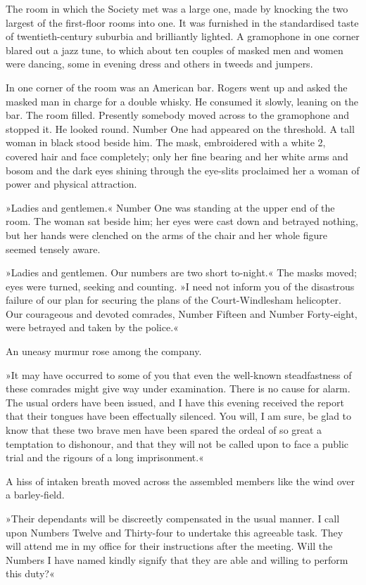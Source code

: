 The room in which the Society met was a large one, made by knocking the two largest of the first-floor rooms into one. It was furnished in the standardised taste of twentieth-century suburbia and brilliantly lighted. A gramophone in one corner blared out a jazz tune, to which about ten couples of masked men and women were dancing, some in evening dress and others in tweeds and jumpers.

In one corner of the room was an American bar. Rogers went up and asked the masked man in charge for a double whisky. He consumed it slowly, leaning on the bar. The room filled. Presently somebody moved across to the gramophone and stopped it. He looked round. Number One had appeared on the threshold. A tall woman in black stood beside him. The mask, embroidered with a white 2, covered hair and face completely; only her fine bearing and her white arms and bosom and the dark eyes shining through the eye-slits proclaimed her a woman of power and physical attraction.

»Ladies and gentlemen.« Number One was standing at the upper end of the room. The woman sat beside him; her eyes were cast down and betrayed nothing, but her hands were clenched on the arms of the chair and her whole figure seemed tensely aware.

»Ladies and gentlemen. Our numbers are two short to-night.« The masks moved; eyes were turned, seeking and counting. »I need not inform you of the disastrous failure of our plan for securing the plans of the Court-Windlesham helicopter. Our courageous and devoted comrades, Number Fifteen and Number Forty-eight, were betrayed and taken by the police.«

An uneasy murmur rose among the company.

»It may have occurred to some of you that even the well-known steadfastness of these comrades might give way under examination. There is no cause for alarm. The usual orders have been issued, and I have this evening received the report that their tongues have been effectually silenced. You will, I am sure, be glad to know that these two brave men have been spared the ordeal of so great a temptation to dishonour, and that they will not be called upon to face a public trial and the rigours of a long imprisonment.«

A hiss of intaken breath moved across the assembled members like the wind over a barley-field.

»Their dependants will be discreetly compensated in the usual manner. I call upon Numbers Twelve and Thirty-four to undertake this agreeable task. They will attend me in my office for their instructions after the meeting. Will the Numbers I have named kindly signify that they are able and willing to perform this duty?«

